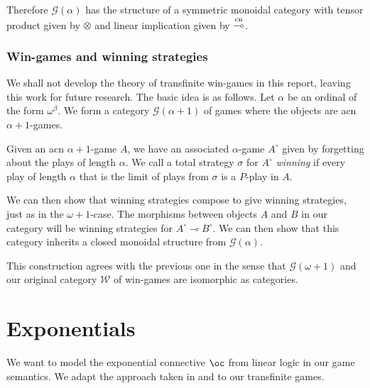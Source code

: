 \documentclass[11pt]{article} %
\theoremstyle{plain} %
\theoremstyle{definition} %
\theoremstyle{note}
\theoremstyle{exercisestyle}
\newcommand{\tensor}{\otimes}
\renewcommand{\implies}{\multimap}
\newcommand{\G}{\mathcal G}
\DeclareMathOperator{\cn}{cn}
\newcommand{\impliescn}{\protect\overset{\cn}{\implies}}
\begin{document}
Therefore $\G(\alpha)$ has the structure of a symmetric monoidal category with tensor product given by $\tensor$ and linear implication given by $\impliescn$.  

\subsubsection{Win-games and winning strategies}

We shall not develop the theory of transfinite win-games in this report, leaving this work for future research.  The basic idea is as follows.  Let $\alpha$ be an ordinal of the form $\omega^\beta$.  We form a category $\G(\alpha+1)$ of games where the objects are acn $\alpha+1$-games.  

Given an acn $\alpha+1$-game $A$, we have an associated $\alpha$-game $A^\circ$ given by forgetting about the plays of length $\alpha$.  We call a total strategy $\sigma$ for $A^\circ$ \emph{winning} if every play of length $\alpha$ that is the limit of plays from $\sigma$ is a $P$-play in $A$.  

We can then show that winning strategies compose to give winning strategies, just as in the $\omega+1$-case.  The morphisms between objects $A$ and $B$ in our category will be winning strategies for $A^\circ\implies B^\circ$.  We can then show that this category inherits a closed monoidal structure from $\G(\alpha)$.  

This construction agrees with the previous one in the sense that $\G(\omega+1)$ and our original category $\mathcal W$ of win-games are isomorphic as categories.  

\section{Exponentials}

We want to model the exponential connective $\oc$ from linear logic in our game semantics.  We adapt the approach taken in \cite{laird02} and \cite{martinsthesis} to our transfinite games.
\end{document}
